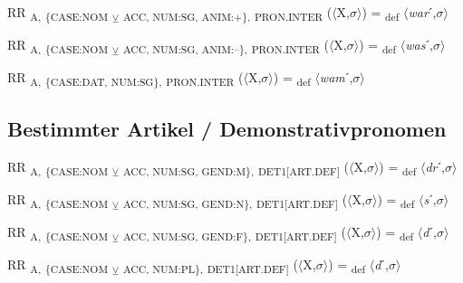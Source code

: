 {\begin{exe}
 RR \textsubscript{A,} \textsubscript{\{CASE:NOM} \textsubscript{${\veebar}$}\textsubscript{ ACC, NUM:SG, ANIM:+\},} \textsubscript{PRON.INTER} ($\langle$X,$\sigma $$\rangle$) = \textsubscript{def} $\langle$\textit{war}ˊ,$\sigma $$\rangle$
\end{exe}

\begin{exe}
 RR \textsubscript{A,} \textsubscript{\{CASE:NOM} \textsubscript{${\veebar}$}\textsubscript{ ACC, NUM:SG, ANIM:–\},} \textsubscript{PRON.INTER} ($\langle$X,$\sigma $$\rangle$) = \textsubscript{def} $\langle$\textit{was}ˊ,$\sigma $$\rangle$
\end{exe}

\begin{exe}
 RR \textsubscript{A,} \textsubscript{\{CASE:DAT, NUM:SG\},} \textsubscript{PRON.INTER} ($\langle$X,$\sigma $$\rangle$) = \textsubscript{def} $\langle$\textit{wam}ˊ,$\sigma $$\rangle$
\end{exe}

\subsection{Bestimmter Artikel / Demonstrativpronomen}


\begin{exe}
 RR \textsubscript{A,} \textsubscript{\{CASE:NOM} \textsubscript{${\veebar}$}\textsubscript{ ACC, NUM:SG, GEND:M\},} \textsubscript{DET1[ART.DEF]} ($\langle$X,$\sigma $$\rangle$) = \textsubscript{def} $\langle$\textit{dr}ˊ,$\sigma $$\rangle$
\end{exe}

\begin{exe}
 RR \textsubscript{A,} \textsubscript{\{CASE:NOM} \textsubscript{${\veebar}$}\textsubscript{ ACC, NUM:SG, GEND:N\},} \textsubscript{DET1[ART.DEF]} ($\langle$X,$\sigma $$\rangle$) = \textsubscript{def} $\langle$\textit{s}ˊ,$\sigma $$\rangle$
\end{exe}

\begin{exe}
 RR \textsubscript{A,} \textsubscript{\{CASE:NOM} \textsubscript{${\veebar}$}\textsubscript{ ACC, NUM:SG, GEND:F\},} \textsubscript{DET1[ART.DEF]} ($\langle$X,$\sigma $$\rangle$) = \textsubscript{def} $\langle$\textit{d}ˊ,$\sigma $$\rangle$
\end{exe}

\begin{exe}
 RR \textsubscript{A,} \textsubscript{\{CASE:NOM} \textsubscript{${\veebar}$}\textsubscript{ ACC, NUM:PL\},} \textsubscript{DET1[ART.DEF]} ($\langle$X,$\sigma $$\rangle$) = \textsubscript{def} $\langle$\textit{d}ˊ,$\sigma $$\rangle$
\end{exe}

}
